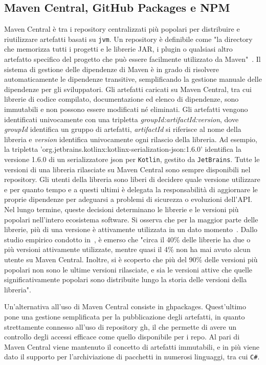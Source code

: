 \documentclass[12pt,a4paper,openright,twoside]{book}
\begin{document}
\subsection{Maven Central, GitHub Packages e NPM}
Maven Central è tra i repository centralizzati più popolari per distribuire e riutilizzare artefatti basati su \texttt{\ac{jvm}}.
Un repository è definibile come "la directory che memorizza tutti i progetti e le librerie JAR, i plugin
o qualsiasi altro artefatto specifico del progetto che può essere facilmente utilizzato da Maven"~\cite{kozak2022three}.
Il sistema di gestione delle dipendenze di Maven è in grado di risolvere automaticamente le dipendenze transitive,
semplificando la gestione manuale delle dipendenze per gli sviluppatori. 
Gli artefatti caricati su Maven Central, tra cui librerie di codice compilato, documentazione ed elenco di dipendenze,
sono immutabili e non possono essere modificati né eliminati.
Gli artefatti vengono identificati univocamente con una tripletta \textit{groupId:artifactId:version},
dove \textit{groupId} identifica un gruppo di artefatti, \textit{artifactId} si riferisce al nome della libreria
e \textit{version} identifica univocamente ogni rilascio della libreria.
Ad esempio, la tripletta 'org.jetbrains.kotlinx:kotlinx-serialization-json:1.6.0' 
identifica la versione 1.6.0 di un serializzatore json per \texttt{Kotlin}, gestito da \texttt{JetBrains}.
Tutte le versioni di una libreria rilasciate su Maven Central sono sempre disponibili nel repository. 
Gli utenti della libreria sono liberi di decidere quale versione utilizzare e per quanto tempo e a questi ultimi è delegata la responsabilità di aggiornare le proprie dipendenze per 
adeguarsi a problemi di sicurezza o evoluzioni dell'API.
Nel lungo termine, queste decisioni determinano le librerie e le versioni più popolari nell'intero ecosistema software.
Si osserva che per la maggior parte delle librerie, più di una versione è attivamente utilizzata in un dato momento~\cite{soto2019emergence}. 
Dallo studio empirico condotto in~\cite{soto2019emergence}, è emerso che "circa il 40\% delle librerie ha due o più versioni attivamente utilizzate, 
mentre quasi il 4\% non ha mai avuto alcun utente su Maven Central. 
Inoltre, si è scoperto che più del 90\% delle versioni più popolari non sono le ultime versioni rilasciate, 
e sia le versioni attive che quelle significativamente popolari sono distribuite lungo la storia delle versioni della libreria".

Un'alternativa all'uso di Maven Central consiste in \ac{ghpackages}. Quest'ultimo pone una gestione 
semplificata per la pubblicazione degli artefatti, in quanto strettamente connesso all'uso di repository \ac{gh},
il che permette di avere un controllo degli accessi efficace come quello disponibile per i repo.
Al pari di Maven Central viene mantenuto il concetto di artefatti immutabili, e in più viene dato il supporto
per l'archiviazione di pacchetti in numerosi linguaggi, tra cui \texttt{C\#}.
\end{document}

